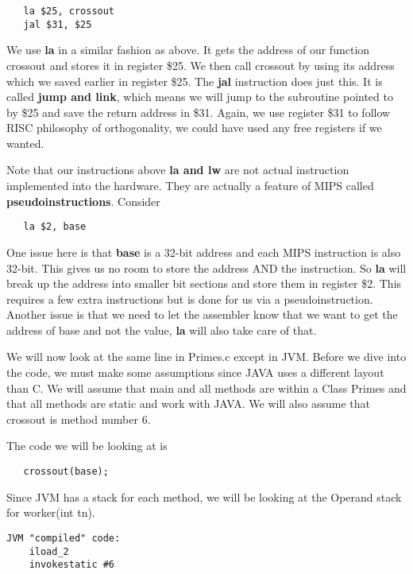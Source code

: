 \documentclass[11pt]{article}
\begin{document}
\begin{verbatim}
   la $25, crossout
   jal $31, $25
\end{verbatim}

We use {\bf la} in a similar fashion as above. It gets the address of our function crossout and stores it in register \$25. We then call crossout by using its address which we saved earlier in register \$25. The {\bf jal} instruction does just this. It is called {\bf jump and link}, which means we will jump to the subroutine pointed to by \$25 and save the return address in \$31. Again, we use register \$31 to follow RISC philosophy of orthogonality, we could have used any free registers if we wanted.

Note that our instructions above {\bf la and lw} are not actual instruction implemented into the hardware. They are actually a feature of MIPS called {\bf pseudoinstructions}. Consider 

\begin{verbatim}
   la $2, base
\end{verbatim}

One issue here is that {\bf base} is a 32-bit address and each MIPS instruction is also 32-bit. This gives us no room to store the address AND the instruction. So {\bf la} will break up the address into smaller bit sections and store them in register \$2. This requires a few extra instructions but is done for us via a pseudoinstruction. Another issue is that we need to let the assembler know that we want to get the address of base and not the value, {\bf la} will also take care of that.


We will now look at the same line in Primes.c except in JVM. Before we dive into the code, we must make some assumptions since JAVA uses a different layout than C. We will assume that main and all methods are within a Class Primes and that all methods are static and work with JAVA. We will also assume that crossout is method number 6.

The code we will be looking at is 
\begin{verbatim}
   crossout(base);
\end{verbatim}

Since JVM has a stack for each method, we will be looking at the Operand stack for worker(int tn).

\begin{verbatim}
JVM "compiled" code:
    iload_2
    invokestatic #6
\end{verbatim}
\end{document}
